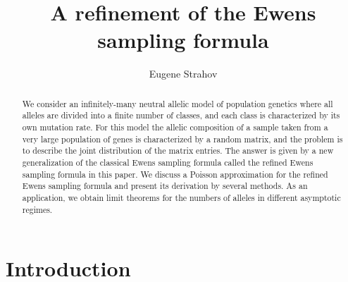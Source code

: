 \documentclass[12pt]{amsart}
\theoremstyle{definition}
\numberwithin{equation}{section}
\begin{document}
\title[A refinement of the Ewens sampling formula]
{\bf{A refinement of the Ewens sampling formula}}
\author{Eugene Strahov}
\address{Department of Mathematics, The Hebrew University of Jerusalem, Givat Ram, Jerusalem 91904, Israel}

\commby{}
\begin{abstract} We consider an infinitely-many neutral allelic model of population genetics where all alleles
are  divided into a finite number of classes, and each class is characterized by its own mutation rate.  For this model the allelic composition of  a  sample taken from
a very large population of genes is characterized by a random matrix, and  the   problem is to describe  the joint distribution of the matrix entries. The answer is given by
a new generalization of the classical Ewens sampling formula called the refined Ewens sampling formula in this paper. We discuss a Poisson approximation for the refined Ewens sampling formula and present its derivation by several methods. As an application,
we obtain limit theorems
for the numbers of alleles in different asymptotic regimes.

\end{abstract}

\maketitle
\section{Introduction}
\end{document}
